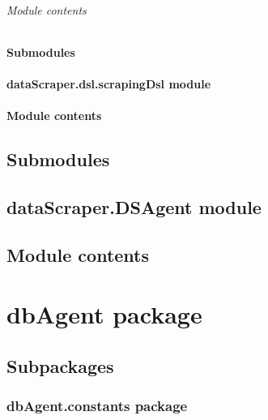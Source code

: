 \documentclass[letterpaper,10pt,english]{sphinxmanual}
\begin{document}
\subparagraph{Module contents}
\label{dataScraper.dsl.req:module-dataScraper.dsl.req}\label{dataScraper.dsl.req:module-contents}

\subsubsection{Submodules}
\label{dataScraper.dsl:submodules}

\subsubsection{dataScraper.dsl.scrapingDsl module}
\label{dataScraper.dsl:datascraper-dsl-scrapingdsl-module}

\subsubsection{Module contents}
\label{dataScraper.dsl:module-contents}\label{dataScraper.dsl:module-dataScraper.dsl}

\section{Submodules}
\label{dataScraper:submodules}

\section{dataScraper.DSAgent module}
\label{dataScraper:datascraper-dsagent-module}

\section{Module contents}
\label{dataScraper:module-dataScraper}\label{dataScraper:module-contents}

\chapter{dbAgent package}
\label{dbAgent::doc}\label{dbAgent:dbagent-package}

\section{Subpackages}
\label{dbAgent:subpackages}

\subsection{dbAgent.constants package}
\label{dbAgent.constants:dbagent-constants-package}\label{dbAgent.constants::doc}
\end{document}
